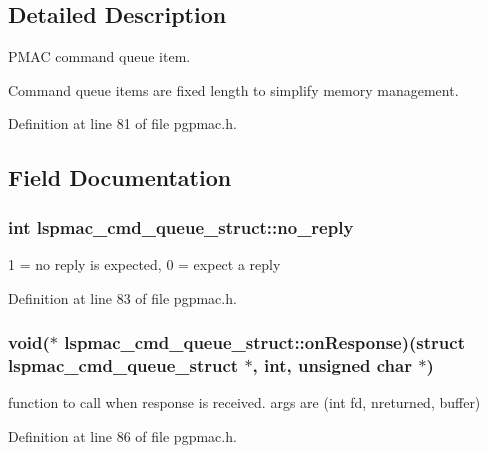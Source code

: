 \subsection{Detailed Description}
P\-M\-A\-C command queue item. 

Command queue items are fixed length to simplify memory management. 

Definition at line 81 of file pgpmac.\-h.



\subsection{Field Documentation}
\hypertarget{structlspmac__cmd__queue__struct_a33f70b45f8b7c27935cd3efe28748479}{
\subsubsection[{no\-\_\-reply}]{\setlength{\rightskip}{0pt plus 5cm}int lspmac\-\_\-cmd\-\_\-queue\-\_\-struct\-::no\-\_\-reply}}\label{structlspmac__cmd__queue__struct_a33f70b45f8b7c27935cd3efe28748479}


1 = no reply is expected, 0 = expect a reply 



Definition at line 83 of file pgpmac.\-h.

\hypertarget{structlspmac__cmd__queue__struct_afe92c0bab9f124314a6f3d8104c94364}{
\subsubsection[{on\-Response}]{\setlength{\rightskip}{0pt plus 5cm}void($\ast$ lspmac\-\_\-cmd\-\_\-queue\-\_\-struct\-::on\-Response)(struct {\bf lspmac\-\_\-cmd\-\_\-queue\-\_\-struct} $\ast$, int, unsigned char $\ast$)}}\label{structlspmac__cmd__queue__struct_afe92c0bab9f124314a6f3d8104c94364}


function to call when response is received. args are (int fd, nreturned, buffer) 



Definition at line 86 of file pgpmac.\-h.

